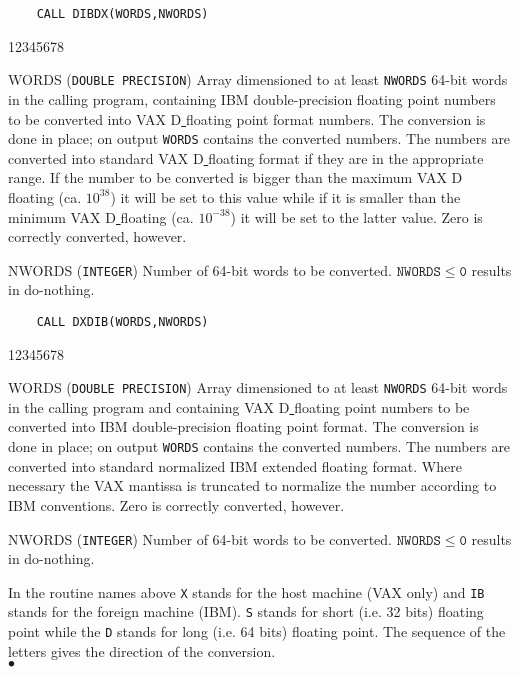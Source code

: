 \begin{verbatim}
    CALL DIBDX(WORDS,NWORDS)
\end{verbatim}
\begin{DLtt}{12345678}
\item [WORDS] ({\tt DOUBLE PRECISION}) Array dimensioned to at least
{\tt NWORDS} 64-bit words in the calling program, containing IBM
double-precision floating point numbers to be converted into VAX
D\underline{ }floating point format numbers. The conversion is done in
place; on output {\tt WORDS} contains the converted numbers. The numbers
are converted into standard VAX D\underline{ }floating format if they
are in the appropriate range. If the number to be converted is bigger
than the maximum VAX D\underline{ }floating (ca. $10^{38}$) it
will be set to this value while if it is smaller than the minimum VAX
D\underline{ }floating (ca. $10^{-38}$) it will be set to the latter
value. Zero is correctly converted, however.
\item [NWORDS] ({\tt INTEGER}) Number of 64-bit words to be converted.
$\mathtt{NWORDS \leq 0}$ results in do-nothing.
\end{DLtt}
\begin{verbatim}
    CALL DXDIB(WORDS,NWORDS)
\end{verbatim}
\begin{DLtt}{12345678}
\item [WORDS] ({\tt DOUBLE PRECISION}) Array dimensioned to at least
{\tt NWORDS} 64-bit words in the calling program and containing VAX
D\underline{ }floating point numbers to be converted into IBM
double-precision floating point format. The conversion is done in place;
on output {\tt WORDS} contains the converted numbers. The numbers are
converted into standard normalized IBM extended floating format.
Where necessary the VAX mantissa is truncated to normalize the number
according to IBM conventions. Zero is correctly converted, however.
\item [NWORDS] ({\tt INTEGER}) Number of 64-bit words to be converted.
$\mathtt{NWORDS \leq 0}$ results in do-nothing.
\end{DLtt}
\Notes
In the routine names above {\tt X} stands for the host
machine (VAX only) and {\tt IB} stands for the foreign machine (IBM).
{\tt S} stands for short (i.e. 32 bits) floating point while the
{\tt D} stands for long (i.e. 64 bits) floating point.
The sequence of the letters gives the direction of the conversion.
\\ $\bullet$
